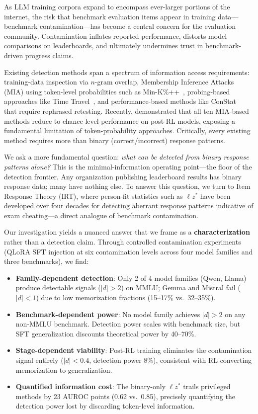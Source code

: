 \documentclass[11pt,a4paper]{article}
\newcommand{\lzstar}{\ensuremath{\ell z^*}}
\begin{document}
As LLM training corpora expand to encompass ever-larger portions of the internet, the risk that benchmark evaluation items appear in training data---benchmark contamination---has become a central concern for the evaluation community.
Contamination inflates reported performance, distorts model comparisons on leaderboards, and ultimately undermines trust in benchmark-driven progress claims.

Existing detection methods span a spectrum of information access requirements: training-data inspection via $n$-gram overlap, Membership Inference Attacks (MIA) using token-level probabilities such as Min-K\%++~\citep{shi2024detecting}, probing-based approaches like Time Travel~\citep{dong2024generalization}, and performance-based methods like ConStat~\citep{dekoninck2024constat} that require rephrased retesting.
Recently, \citet{wang2025rlcontam} demonstrated that all ten MIA-based methods reduce to chance-level performance on post-RL models, exposing a fundamental limitation of token-probability approaches.
Critically, every existing method requires more than binary (correct/incorrect) response patterns.

We ask a more fundamental question: \emph{what can be detected from binary response patterns alone?}
This is the minimal-information operating point---the floor of the detection frontier.
Any organization publishing leaderboard results has binary response data; many have nothing else.
To answer this question, we turn to Item Response Theory (IRT), where person-fit statistics such as $\lzstar$ have been developed over four decades for detecting aberrant response patterns indicative of exam cheating---a direct analogue of benchmark contamination.

Our investigation yields a nuanced answer that we frame as a \textbf{characterization} rather than a detection claim.
Through controlled contamination experiments (QLoRA SFT injection at six contamination levels across four model families and three benchmarks), we find:

\begin{itemize}
\item \textbf{Family-dependent detection}: Only 2 of 4 model families (Qwen, Llama) produce detectable signals ($|d|>2$) on MMLU; Gemma and Mistral fail ($|d|<1$) due to low memorization fractions (15--17\% vs.\ 32--35\%).
\item \textbf{Benchmark-dependent power}: No model family achieves $|d|>2$ on any non-MMLU benchmark. Detection power scales with benchmark size, but SFT generalization discounts theoretical power by 40--70\%.
\item \textbf{Stage-dependent viability}: Post-RL training eliminates the contamination signal entirely ($|d|<0.4$, detection power 8\%), consistent with RL converting memorization to generalization.
\item \textbf{Quantified information cost}: The binary-only $\lzstar$ trails privileged methods by 23 AUROC points (0.62 vs.\ 0.85), precisely quantifying the detection power lost by discarding token-level information.
\end{itemize}
\end{document}
